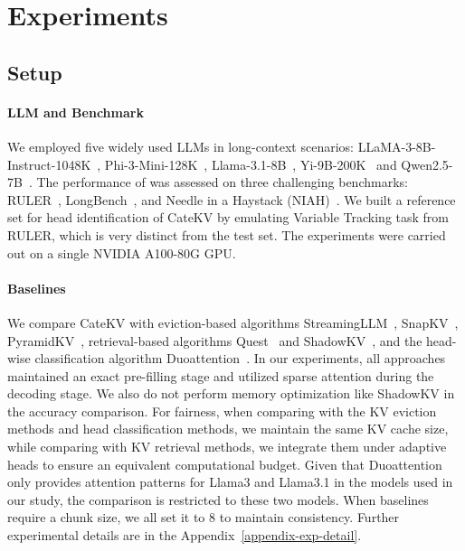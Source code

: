 \section{Experiments}
\subsection{Setup}
\paragraph{LLM and Benchmark}
We employed five widely used LLMs in long-context scenarios: LLaMA-3-8B-Instruct-1048K~\cite{llama3-8b}, Phi-3-Mini-128K~\cite{phi}, Llama-3.1-8B~\cite{llama3-1}, Yi-9B-200K~\cite{yi} and Qwen2.5-7B~\cite{qwen}. The performance of \shortname was assessed on three challenging benchmarks: RULER~\cite{ruler}, LongBench~\cite{longbench}, and Needle in a Haystack (NIAH)~\cite{niah}. We built a reference set for head identification of CateKV by emulating Variable Tracking task from RULER, which is very distinct from the test set. The experiments were carried out on a single NVIDIA A100-80G GPU.

\paragraph{Baselines}
We compare CateKV with eviction-based algorithms StreamingLLM~\cite{streamingllm}, SnapKV~\cite{snapkv}, PyramidKV~\cite{pyramidkv}, retrieval-based algorithms Quest~\cite{quest} and ShadowKV~\cite{shadowkv}, and the head-wise classification algorithm Duoattention~\cite{duoattention}.
In our experiments, all approaches maintained an exact pre-filling stage and utilized sparse attention during the decoding stage.  
We also do not perform memory optimization like ShadowKV in the accuracy comparison.
For fairness, when comparing with the KV eviction methods and head classification methods, we maintain the same KV cache size, while comparing with KV retrieval methods, we integrate them under adaptive heads to ensure an equivalent computational budget.
Given that Duoattention only provides attention patterns for Llama3 and Llama3.1 in the models used in our study, the comparison is restricted to these two models.
When baselines require a chunk size, we all set it to 8 to maintain consistency.
Further experimental details are in the Appendix~\ref{appendix-exp-detail}.





